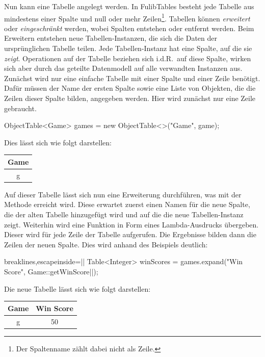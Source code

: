 Nun kann eine Tabelle angelegt werden.
In FulibTables besteht jede Tabelle aus mindestens einer Spalte und null oder mehr Zeilen\footnote{Der Spaltenname zählt dabei nicht als Zeile.}.
Tabellen können \emph{erweitert} oder \emph{eingeschränkt} werden, wobei Spalten entstehen oder entfernt werden.
Beim Erweitern entstehen neue Tabellen-Instanzen,
die sich die Daten der ursprünglichen Tabelle teilen.
Jede Tabellen-Instanz hat eine Spalte, auf die sie \emph{zeigt}.
Operationen auf der Tabelle beziehen sich i.d.R.\ auf diese Spalte,
wirken sich aber durch das geteilte Datenmodell auf alle verwandten Instanzen aus.
Zunächst wird nur eine einfache Tabelle mit einer Spalte und einer Zeile benötigt.
Dafür müssen der Name der ersten Spalte sowie eine Liste von Objekten, die die Zeilen dieser Spalte bilden, angegeben werden.
Hier wird zunächst nur eine Zeile gebraucht.

\begin{jcodeblock}
    ObjectTable<Game> games = new ObjectTable<>("Game", game);
\end{jcodeblock}

Dies lässt sich wie folgt darstellen:

\begin{tabular}{|c|}
    \hline
    \textbf{Game} \\
    \hline
    g \\
    \hline
\end{tabular}

Auf dieser Tabelle lässt sich nun eine Erweiterung durchführen, was mit der Methode  erreicht wird.
Diese erwartet zuerst einen Namen für die neue Spalte, die der alten Tabelle hinzugefügt wird und auf die die neue Tabellen-Instanz zeigt.
Weiterhin wird eine Funktion in Form eines Lambda-Ausdrucks übergeben.
Dieser wird für jede Zeile der Tabelle aufgerufen.
Die Ergebnisse bilden dann die Zeilen der neuen Spalte.
Dies wird anhand des Beispiels deutlich:

\begin{jcodeblock*}{breaklines,escapeinside=||}
    Table<Integer> winScores = games.expand("Win Score", Game::getWinScore|\footnotemark|);
\end{jcodeblock*}

Die neue Tabelle lässt sich wie folgt darstellen:

\begin{tabular}{|c|c|}
    \hline
    \textbf{Game} & \textbf{Win Score} \\
    \hline
    g & 50 \\
    \hline
\end{tabular}


